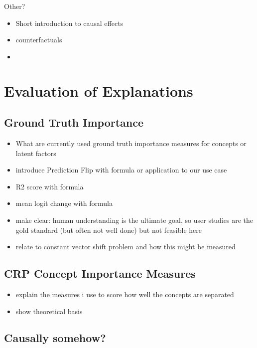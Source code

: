 Other?

\begin{itemize}
    \item Short introduction to causal effects    \item counterfactuals
    \item
\end{itemize}


\section{Evaluation of Explanations}
\subsection{Ground Truth Importance}
\begin{itemize}
    \item What are currently used ground truth importance measures for concepts or latent factors
    \item introduce Prediction Flip with formula or application to our use case
    \item R2 score with formula \cite{Sixt2020}
    \item mean logit change with formula
    \item make clear: human understanding is the ultimate goal, so user studies are the gold standard (but often not well done) but not feasible here
    \item relate to constant vector shift problem and how this might be measured
\end{itemize}
\subsection{CRP Concept Importance Measures}
\begin{itemize}
    \item explain the measures i use to score how well the concepts are separated
    \item show theoretical basis
\end{itemize}
\subsection{Causally somehow? }